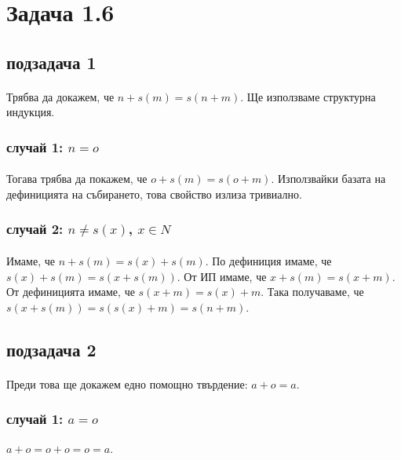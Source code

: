 \documentclass[12pt]{article}
\begin{document}
\section*{Задача 1.6}
\paragraph*{}

\subsection*{подзадача 1}
\paragraph*{}
Трябва да докажем, че $n+s(m)=s(n+m)$. Ще използваме структурна индукция.
\subsubsection*{случай 1: $n = o$}
\paragraph*{}
Тогава трябва да покажем, че $o + s(m) = s(o+m)$. Използвайки базата на дефиницията на събирането, това свойство излиза тривиално.
\subsubsection*{случай 2: $n \neq s(x)$, $x \in N$}
\paragraph*{}
Имаме, че $n+s(m) = s(x)+s(m)$. По дефиниция имаме, че $s(x)+s(m) = s(x + s(m))$. От ИП имаме, че $x+s(m) = s(x+m)$. От дефиницията имаме, че $s(x+m) = s(x) + m$. Така получаваме, че $s(x+s(m)) = s(s(x)+m) = s(n+m)$. 

\subsection*{подзадача 2}

\paragraph*{}
Преди това ще докажем едно помощно твърдение: $a+o = a$.
\subsubsection*{случай 1: $a = o$}
$a + o = o + o = o = a$.
\end{document}
